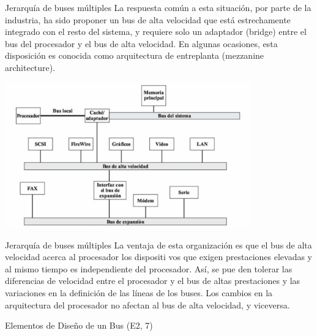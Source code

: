 \documentclass[presentation]{beamer}
\begin{document}
\begin{frame}[label={sec:org896d22a}]{Jerarquía de buses múltiples}
La respuesta común a esta
situación, por parte de la industria, ha sido proponer un bus de alta velocidad que está estrechamente
integrado con el resto del sistema, y requiere solo un adaptador (bridge) entre el bus del procesador y
el bus de alta velocidad. En algunas ocasiones, esta disposición es conocida como arquitectura de
entreplanta (mezzanine architecture).

\begin{center}
\includegraphics[width=0.8\textwidth]{./Images/jerarquiaBuses2.jpeg}
\end{center}
\end{frame}

\begin{frame}[label={sec:org37e875b}]{Jerarquía de buses múltiples}
La ventaja de esta organización es que el bus de alta velocidad acerca al procesador los dispositi
vos que exigen prestaciones elevadas y al mismo tiempo es independiente del procesador. Así, se pue
den tolerar las diferencias de velocidad entre el procesador y el bus de altas prestaciones y las
variaciones en la definición de las líneas de los buses. Los cambios en la arquitectura del procesador
no afectan al bus de alta velocidad, y viceversa.
\end{frame}
\begin{frame}[label={sec:org23b93a9}]{Elementos de Diseño de un Bus (E2, 7)}
\end{frame}
\end{document}

